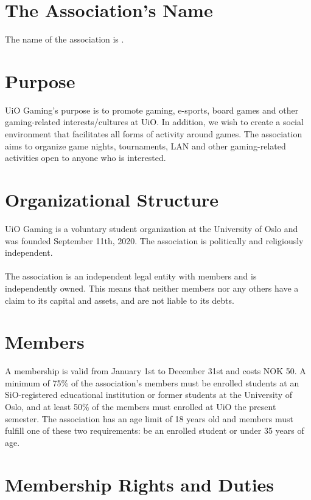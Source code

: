 \documentclass[12pt,a4paper,norsk]{article}
\begin{document}



\section{The Association's Name}

The name of the association is .


\section{Purpose}

UiO Gaming's purpose is to promote gaming, e-sports, board games and other gaming-related interests/cultures at UiO. In addition, we wish to create a social environment that facilitates all forms of activity around games. The association aims to organize game nights, tournaments, LAN and other gaming-related activities open to anyone who is interested.



\section{Organizational Structure}

UiO Gaming is a voluntary student organization at the University of Oslo and was founded September 11th, 2020. The association is politically and religiously independent.
\\
\\
The association is an independent legal entity with members and is independently owned. This means that neither members nor any others have a claim to its capital and assets, and are not liable to its debts.



\section{Members}

A membership is valid from January 1st to December 31st and costs NOK 50. A minimum of 75\% of the association's members must be enrolled students at an SiO-registered educational institution or former students at the University of Oslo, and at least 50\% of the members must enrolled at UiO the present semester. The association has an age limit of 18 years old and members must fulfill one of these two requirements: be an enrolled student or under 35 years of age.



\section{Membership Rights and Duties}
\end{document}
